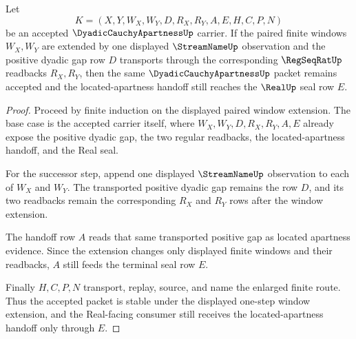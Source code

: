\begin{theorem}
\label{thm:dyadic-cauchy-apartness-window-induction}
Let
$$
K=(X,Y,W_X,W_Y,D,R_X,R_Y,A,E,H,C,P,N)
$$
be an accepted $\DyadicCauchyApartnessUp$ carrier. If the paired finite windows $W_X,W_Y$ are extended by one displayed $\StreamNameUp$ observation and the positive dyadic gap row $D$ transports through the corresponding $\RegSeqRatUp$ readbacks $R_X,R_Y$, then the same $\DyadicCauchyApartnessUp$ packet remains accepted and the located-apartness handoff still reaches the $\RealUp$ seal row $E$.
\end{theorem}
\begin{proof}
Proceed by finite induction on the displayed paired window extension. The base case is the accepted carrier itself, where $W_X,W_Y,D,R_X,R_Y,A,E$ already expose the positive dyadic gap, the two regular readbacks, the located-apartness handoff, and the Real seal.

For the successor step, append one displayed $\StreamNameUp$ observation to each of $W_X$ and $W_Y$. The transported positive dyadic gap remains the row $D$, and its two readbacks remain the corresponding $R_X$ and $R_Y$ rows after the window extension.

The handoff row $A$ reads that same transported positive gap as located apartness evidence. Since the extension changes only displayed finite windows and their readbacks, $A$ still feeds the terminal seal row $E$.

Finally $H,C,P,N$ transport, replay, source, and name the enlarged finite route. Thus the accepted packet is stable under the displayed one-step window extension, and the Real-facing consumer still receives the located-apartness handoff only through $E$.
\end{proof}


